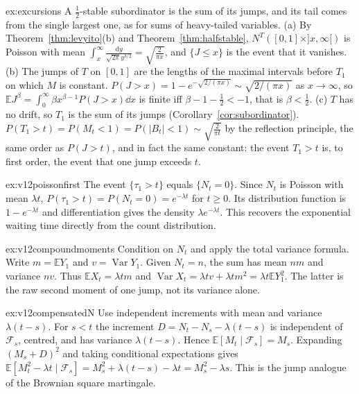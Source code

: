 \begin{solution}{ex:excursions}
\idea A $\frac12$-stable subordinator is the sum of its jumps, and its tail comes from the single largest one, as for sums of heavy-tailed variables.
\writeup (a) By Theorem~\ref{thm:levyito}(b) and Theorem~\ref{thm:halfstable}, $N^T([0,1]\times]x,\infty[)$ is Poisson with mean $\int_x^\infty\frac{\mathrm dy}{\sqrt{2\pi}y^{3/2}}=\sqrt{\frac2{\pi x}}$, and $\{J\le x\}$ is the event that it vanishes.
(b) The jumps of $T$ on $[0,1]$ are the lengths of the maximal intervals before $T_1$ on which $M$ is constant. $P(J>x)=1-e^{-\sqrt{2/(\pi x)}}\sim\sqrt{2/(\pi x)}$ as $x\to\infty$, so $\mathbb EJ^\beta=\int_0^\infty\beta x^{\beta-1}P(J>x)\dd x$ is finite iff
$\beta-1-\frac12<-1$, that is $\beta<\frac12$. (c) $T$ has no drift, so $T_1$ is the sum of its jumps (Corollary~\ref{cor:subordinator}). $P(T_1>t)=P(M_t<1)=P(|B_t|<1)\sim\sqrt{\frac2{\pi t}}$ by the reflection principle, the same order
as $P(J>t)$, and in fact the same constant: the event $T_1>t$ is, to first order, the event that one jump exceeds $t$.
\end{solution}

\begin{solution}{ex:v12poissonfirst}
\idea The event $\{\tau_1>t\}$ equals $\{N_t=0\}$.
\writeup Since $N_t$ is Poisson with mean $\lambda t$, $P(\tau_1>t)=P(N_t=0)=e^{-\lambda t}$ for $t\ge0$. Its distribution function is $1-e^{-\lambda t}$ and differentiation gives the density $\lambda e^{-\lambda t}$. This recovers the exponential waiting time directly from the count distribution.
\end{solution}

\begin{solution}{ex:v12compoundmoments}
\idea Condition on $N_t$ and apply the total variance formula.
\writeup Write $m=\mathbb EY_1$ and $v=\operatorname{Var}Y_1$. Given $N_t=n$, the sum has mean $nm$ and variance $nv$. Thus $\mathbb EX_t=\lambda tm$ and $\operatorname{Var}X_t=\lambda tv+\lambda tm^2=\lambda t\mathbb EY_1^2$. The latter is the raw second moment of one jump, not its variance alone.
\end{solution}

\begin{solution}{ex:v12compensatedN}
\idea Use independent increments with mean and variance $\lambda(t-s)$.
\writeup For $s<t$ the increment $D=N_t-N_s-\lambda(t-s)$ is independent of $\mathcal F_s$, centred, and has variance $\lambda(t-s)$. Hence $\mathbb E[M_t\mid\mathcal F_s]=M_s$. Expanding $(M_s+D)^2$ and taking conditional expectations gives $\mathbb E[M_t^2-\lambda t\mid\mathcal F_s]=M_s^2+\lambda(t-s)-\lambda t=M_s^2-\lambda s$. This is the jump analogue of the Brownian square martingale.
\end{solution}

